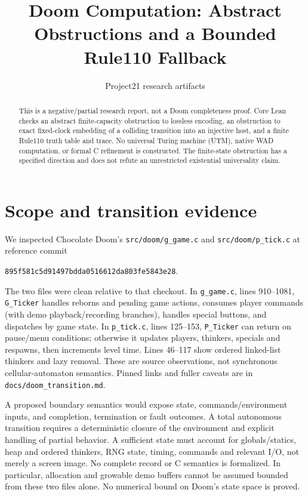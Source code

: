 \documentclass[11pt]{article}
\title{Doom Computation: Abstract Obstructions and a Bounded Rule110 Fallback}
\author{Project21 research artifacts}
\date{}
\begin{document}
\maketitle
\begin{abstract}
This is a negative/partial research report, not a Doom completeness proof.
Core Lean checks an abstract finite-capacity obstruction to lossless encoding,
an obstruction to exact fixed-clock embedding of a colliding transition into
an injective host, and a finite Rule110 truth table and trace. No universal
Turing machine (UTM), native WAD computation, or formal C refinement is
constructed. The finite-state obstruction has a specified direction and does
not refute an unrestricted existential universality claim.
\end{abstract}

\section{Scope and transition evidence}
We inspected Chocolate Doom's \texttt{src/doom/g\_game.c} and
\texttt{src/doom/p\_tick.c} at reference commit
\begin{center}\texttt{895f581c5d91497bdda0516612da803fe5843e28}.\end{center}
The two files were clean relative to that checkout. In \texttt{g\_game.c},
lines 910--1081, \texttt{G\_Ticker} handles reborns and pending game actions,
consumes player commands (with demo playback/recording branches), handles
special buttons, and dispatches by game state. In \texttt{p\_tick.c}, lines
125--153, \texttt{P\_Ticker} can return on pause/menu conditions; otherwise
it updates players, thinkers, specials and respawns, then increments level time.
Lines 46--117 show ordered linked-list thinkers and lazy removal. These are
source observations, not synchronous cellular-automaton semantics.
Pinned links and fuller caveats are in \texttt{docs/doom\_transition.md}.

A proposed boundary semantics would expose state, commands/environment inputs,
and completion, termination or fault outcomes. A total autonomous transition
requires a deterministic closure of the environment and explicit handling of
partial behavior. A sufficient state must account for globals/statics, heap and
ordered thinkers, RNG state, timing, commands and relevant I/O, not merely a
screen image. No complete record or C semantics is formalized. In particular,
allocation and growable demo buffers cannot be assumed bounded from these two
files alone. No numerical bound on Doom's state space is proved.
\end{document}
